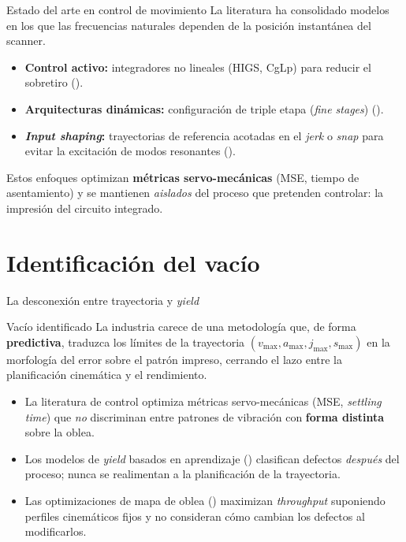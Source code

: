 \documentclass[en,16:9,navbarinline,bigfoot]{sdqbeamer}
\begin{document}
\begin{frame}{Estado del arte en control de movimiento}
    La literatura ha consolidado modelos en los que las frecuencias naturales dependen de la posición instantánea del scanner.
    \vspace{0.2cm}
    \begin{itemize}
        \item \textbf{Control activo:} integradores no lineales (HIGS, CgLp) para reducir el sobretiro (\cite{Heertjes2025_NonlinearControl}).
        \item \textbf{Arquitecturas dinámicas:} configuración de triple etapa (\textit{fine stages}) (\cite{Al-Rawashdeh2022_Caracterization}).
        \item \textbf{\textit{Input shaping}:} trayectorias de referencia acotadas en el \textit{jerk} o \textit{snap} para evitar la excitación de modos resonantes (\cite{Al-Rawashdeh2023_Trajectories,Lambrechts2003_Trajectories}).
    \end{itemize}
    \vspace{0.2cm}
    Estos enfoques optimizan \textbf{métricas servo-mecánicas} (MSE, tiempo de asentamiento) y se mantienen \emph{aislados} del proceso que pretenden controlar: la impresión del circuito integrado.
\end{frame}

\section{Identificación del vacío}

\begin{frame}{La desconexión entre trayectoria y \textit{yield}}
    \begin{redblock}{Vacío identificado}
        La industria carece de una metodología que, de forma \textbf{predictiva}, traduzca los límites de la trayectoria $(v_{\max}, a_{\max}, j_{\max}, s_{\max})$ en la morfología del error sobre el patrón impreso, cerrando el lazo entre la planificación cinemática y el rendimiento.
    \end{redblock}
    \vspace{0.15cm}
    \begin{itemize}
        \item La literatura de control optimiza métricas servo-mecánicas (MSE, \textit{settling time}) que \emph{no} discriminan entre patrones de vibración con \textbf{forma distinta} sobre la oblea.
        \item Los modelos de \textit{yield} basados en aprendizaje (\cite{Yang2018_Yield,Wu2015_WM811K}) clasifican defectos \emph{después} del proceso; nunca se realimentan a la planificación de la trayectoria.
        \item Las optimizaciones de mapa de oblea (\cite{Kim2017_Market,Kim2019_Productivity}) maximizan \textit{throughput} suponiendo perfiles cinemáticos fijos y no consideran cómo cambian los defectos al modificarlos.
    \end{itemize}
\end{frame}
\end{document}
